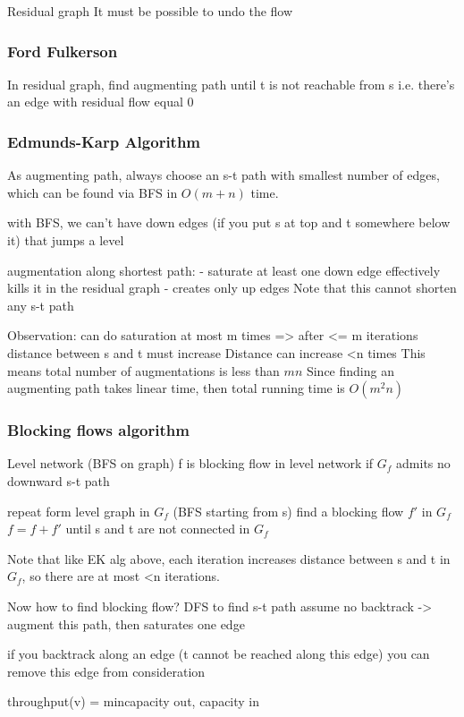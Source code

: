 \documentclass{article}
\begin{document}
Residual graph
It must be possible to undo the flow

\subsubsection{Ford Fulkerson}
In residual graph, find augmenting path until t is not reachable from
s i.e. there's an edge with residual flow equal 0

\subsubsection{Edmunds-Karp Algorithm}
As augmenting path, always choose an s-t path with smallest number of edges,
which can be found via BFS in $O(m + n)$ time.

with BFS, we can't have down edges (if you put s at top and t somewhere below it) that jumps a level

augmentation along shortest path:
- saturate at least one down edge effectively kills it in the residual graph
- creates only up edges
Note that this cannot shorten any s-t path

Observation: can do saturation at most m times
=> after <= m iterations distance between s and t must increase
Distance can increase <n times
This means total number of augmentations is less than $mn$
Since finding an augmenting path takes linear time, then total running time is $O(m^2n)$

\subsubsection{Blocking flows algorithm}
Level network (BFS on graph)
f is blocking flow in level network if $G_f$ admits no downward s-t path

repeat
	form level graph in $G_f$ (BFS starting from s)
	find a blocking flow $f'$ in $G_f$
	$f = f + f'$
until s and t are not connected in $G_f$

Note that like EK alg above, each iteration increases distance between s and
t in $G_f$, so there are at most <n iterations.

Now how to find blocking flow?
DFS to find s-t path
	assume no backtrack -> augment this path, then saturates one edge

	if you backtrack along an edge (t cannot be reached along this edge)
		you can remove this edge from consideration

throughput(v) = min{capacity out, capacity in}
\end{document}
